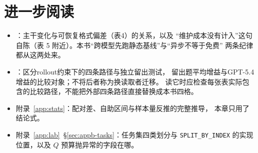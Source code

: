 \section*{进一步阅读}
\begin{itemize}
  \item \cite{anatomy-memory-2602}：主干变化与可恢复格式偏差（表4）的关系，以及
        “维护成本没有计入”这句自陈（表 5 附近）。本书“跨模型先跑静态基线”与“异步不等于免费”
        两条纪律都从这两处来。
  \item \cite{harness-eval-2607}：区分rollout约束下的四条路径与独立留出测试，
        留出题平均增益与GPT-5.4增益的比较对象；不将后者称为换读取者迁移。
        读它时应检查每张表实际包含的比较路径，不能把外部四条路径直接替换成本书四格。
  \item 附录~\ref{app:stats}：配对差、自助区间与样本量反推的完整推导，
        本章只用了结论式。
  \item 附录~\ref{app:lab}~\S\ref{sec:appb-tasks}：任务集四类划分与
        \texttt{SPLIT\_BY\_INDEX} 的实现位置，以及 $Q$ 预算抛异常的字段在哪。
\end{itemize}
